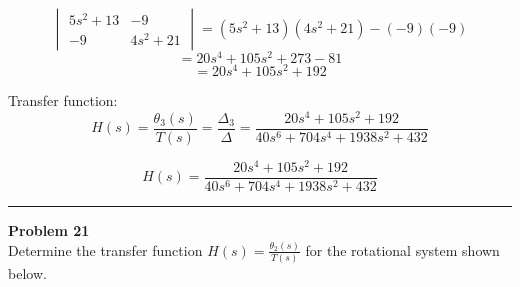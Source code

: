 \[
\begin{vmatrix}5s^2 + 13 & -9 \\ -9 & 4s^2 + 21 \end{vmatrix} 
= (5s^2 +13)(4s^2+21) - (-9)(-9) 
\]
\[
= 20 s^4 + 105 s^2 + 273 - 81 
\]
\[
= 20 s^4 + 105 s^2 + 192
\]

Transfer function:
\[
H(s) = \frac{\theta_3(s)}{T(s)} = \frac{\Delta_3}{\Delta} = \frac{20 s^4 + 105 s^2 + 192}{40 s^6 + 704 s^4 + 1938 s^2 + 432}
\]

\[
\boxed{H(s) = \frac{20 s^4 + 105 s^2 + 192}{40 s^6 + 704 s^4 + 1938 s^2 + 432}}
\]

\newpage

\noindent\rule{\textwidth}{1pt}
\noindent\textbf{Problem 21} \hfill
\\ Determine the transfer function \(H(s) = \frac{\theta_2(s)}{T(s)}\) for the rotational system shown below.

